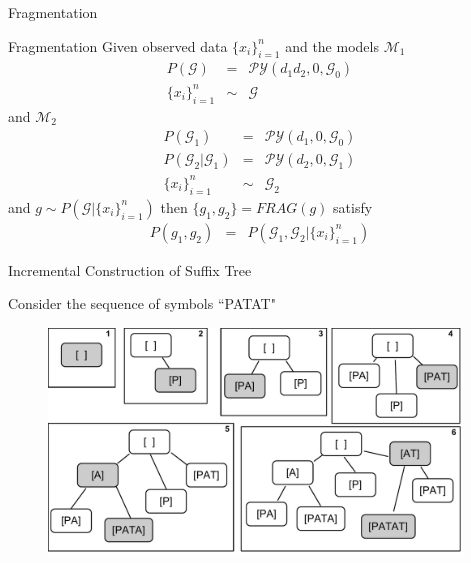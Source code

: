 \documentclass{beamer}
\newcommand{\G}{\mathcal{G}}
\newcommand{\PY}{\mathcal{P}\mathcal{Y}}
\begin{document}
\begin{frame}[t] {Fragmentation}

	\begin{block}{Fragmentation \cite{Pitman1999, Wood2009}}
		Given observed data $\{x_i\}_{i = 1}^n$ and the models $\mathcal{M}_1$ 
		\begin{eqnarray*}
			P(\G) &=& \PY(d_1 d_2, 0, \G_0)\\
			\{x_i\}_{i = 1}^n &\sim& \G
		\end{eqnarray*}
		and $\mathcal{M}_2$
		\begin{eqnarray*}
			P(\G_1) &=& \PY(d_1, 0, \G_0)\\
			P(\G_2 | \G_1) &=& \PY(d_2, 0, \G_1)\\
			\{x_i\}_{i = 1}^n &\sim& \G_2
		\end{eqnarray*}
      	and $g \sim P(\G | \{x_i\}_{i = 1}^n)$ then $\{g_1, g_2\}  = FRAG(g)$ satisfy
		\begin{eqnarray*}
			P(g_1, g_2) &=& P(\G_1, \G_2 |  \{x_i\}_{i = 1}^n)
		\end{eqnarray*}
	\end{block}

\end{frame}

\begin{frame}[t]{Incremental Construction of Suffix Tree \cite{Gasthaus2010}}
	
	Consider the sequence of symbols ``PATAT"
	\begin{figure}[t]
		\begin{center}
			\includegraphics[height = 6cm]{../figs/PATAT.pdf}
		\end{center}
	\end{figure}
\end{frame}
\end{document}
